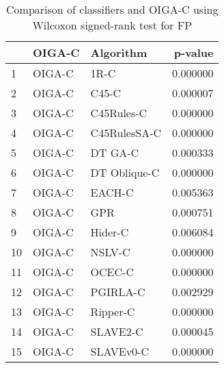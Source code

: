 \begin{table}
\footnotesize
\caption{Comparison of classifiers and OIGA-C using Wilcoxon signed-rank test for FP}
\label{tab:OIGA-C wilcoxon FP comparison}
\begin{tabular}{lllr}
\hline
 & OIGA-C & Algorithm & p-value \\
\hline
1 & OIGA-C & 1R-C & 0.000000 \\
2 & OIGA-C & C45-C & 0.000007 \\
3 & OIGA-C & C45Rules-C & 0.000000 \\
4 & OIGA-C & C45RulesSA-C & 0.000000 \\
5 & OIGA-C & DT GA-C & 0.000333 \\
6 & OIGA-C & DT Oblique-C & 0.000000 \\
7 & OIGA-C & EACH-C & 0.005363 \\
8 & OIGA-C & GPR & 0.000751 \\
9 & OIGA-C & Hider-C & 0.006084 \\
10 & OIGA-C & NSLV-C & 0.000000 \\
11 & OIGA-C & OCEC-C & 0.000000 \\
12 & OIGA-C & PGIRLA-C & 0.002929 \\
13 & OIGA-C & Ripper-C & 0.000000 \\
14 & OIGA-C & SLAVE2-C & 0.000045 \\
15 & OIGA-C & SLAVEv0-C & 0.000000 \\
\hline
\end{tabular}
\end{table}

